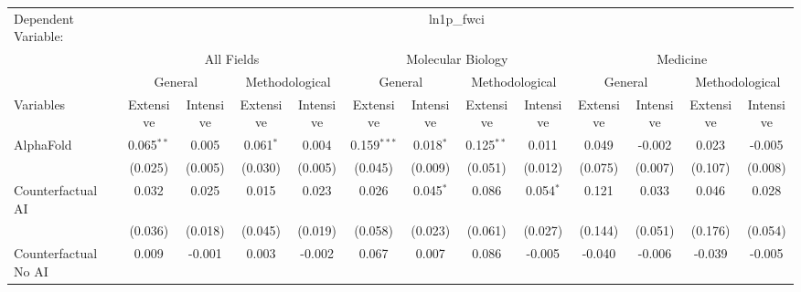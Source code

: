 \begingroup
\centering
\begin{tabular}{lcccccccccccc}
   \tabularnewline \midrule \midrule
   Dependent Variable: & \multicolumn{12}{c}{ln1p\_fwci}\\
 & \multicolumn{4}{c}{All Fields} & \multicolumn{4}{c}{Molecular Biology} & \multicolumn{4}{c}{Medicine} \\
\cmidrule(lr){2-5} \cmidrule(lr){6-9} \cmidrule(lr){10-13}
 & \multicolumn{2}{c}{General} & \multicolumn{2}{c}{Methodological} & \multicolumn{2}{c}{General} & \multicolumn{2}{c}{Methodological} & \multicolumn{2}{c}{General} & \multicolumn{2}{c}{Methodological} \\
\cmidrule(lr){2-3} \cmidrule(lr){4-5} \cmidrule(lr){6-7} \cmidrule(lr){8-9} \cmidrule(lr){10-11} \cmidrule(lr){12-13}
Variables & \multicolumn{1}{c}{Extensive} & \multicolumn{1}{c}{Intensive} & \multicolumn{1}{c}{Extensive} & \multicolumn{1}{c}{Intensive} & \multicolumn{1}{c}{Extensive} & \multicolumn{1}{c}{Intensive} & \multicolumn{1}{c}{Extensive} & \multicolumn{1}{c}{Intensive} & \multicolumn{1}{c}{Extensive} & \multicolumn{1}{c}{Intensive} & \multicolumn{1}{c}{Extensive} & \multicolumn{1}{c}{Intensive} \\
\cmidrule(lr){1-1}\cmidrule(lr){2-2} \cmidrule(lr){3-3} \cmidrule(lr){4-4} \cmidrule(lr){5-5} \cmidrule(lr){6-6} \cmidrule(lr){7-7} \cmidrule(lr){8-8} \cmidrule(lr){9-9} \cmidrule(lr){10-10} \cmidrule(lr){11-11} \cmidrule(lr){12-12} \cmidrule(lr){13-13}
   AlphaFold                                & 0.065$^{**}$  & 0.005    & 0.061$^{*}$   & 0.004    & 0.159$^{***}$ & 0.018$^{*}$   & 0.125$^{**}$ & 0.011       & 0.049   & -0.002   & 0.023   & -0.005\\   
                                            & (0.025)       & (0.005)  & (0.030)       & (0.005)  & (0.045)       & (0.009)       & (0.051)      & (0.012)     & (0.075) & (0.007)  & (0.107) & (0.008)\\   
   Counterfactual AI                        & 0.032         & 0.025    & 0.015         & 0.023    & 0.026         & 0.045$^{*}$   & 0.086        & 0.054$^{*}$ & 0.121   & 0.033    & 0.046   & 0.028\\   
                                            & (0.036)       & (0.018)  & (0.045)       & (0.019)  & (0.058)       & (0.023)       & (0.061)      & (0.027)     & (0.144) & (0.051)  & (0.176) & (0.054)\\   
   Counterfactual No AI                     & 0.009         & -0.001   & 0.003         & -0.002   & 0.067         & 0.007         & 0.086        & -0.005      & -0.040  & -0.006   & -0.039  & -0.005\\   

\end{tabular}
